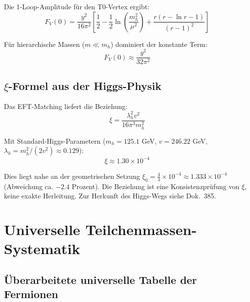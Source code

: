 Die 1-Loop-Amplitude für den T0-Vertex ergibt:
\begin{equation}
	F_V(0) = \frac{y^2}{16\pi^2}\left[\frac{1}{2} - \frac{1}{2}\ln\left(\frac{m_h^2}{\mu^2}\right) + \frac{r(r-\ln r-1)}{(r-1)^2}\right]
\end{equation}

Für hierarchische Massen ($m \ll m_h$) dominiert der konstante Term:
\begin{equation}
	F_V(0) \approx \frac{y^2}{32\pi^2}
\end{equation}

\subsection{$\xi$-Formel aus der Higgs-Physik}
\label{subsec:final_xi_formula}

Das EFT-Matching liefert die Beziehung:
\begin{equation}
	\boxed{\xi = \frac{\lambda_h^2 v^2}{16\pi^3 m_h^2}}
\end{equation}

Mit Standard-Higgs-Parametern ($m_h = 125.1$ GeV, $v = 246.22$ GeV, $\lambda_h = m_h^2/(2v^2) \approx 0.129$):
\begin{equation}
	\xi \approx 1.30 \times 10^{-4}
\end{equation}

Dies liegt nahe an der geometrischen Setzung $\xi_0 = \frac{4}{3} \times 10^{-4} \approx 1.333 \times 10^{-4}$ (Abweichung ca. $-2.4$ Prozent). Die Beziehung ist eine Konsistenzprüfung von $\xi$, keine exakte Herleitung. Zur Herkunft des Higgs-Wegs siehe Dok.~385.

\section{Universelle Teilchenmassen-Systematik}
\label{sec:universal_masses}

\subsection{Überarbeitete universelle Tabelle der Fermionen}
\label{subsec:universal_table}

